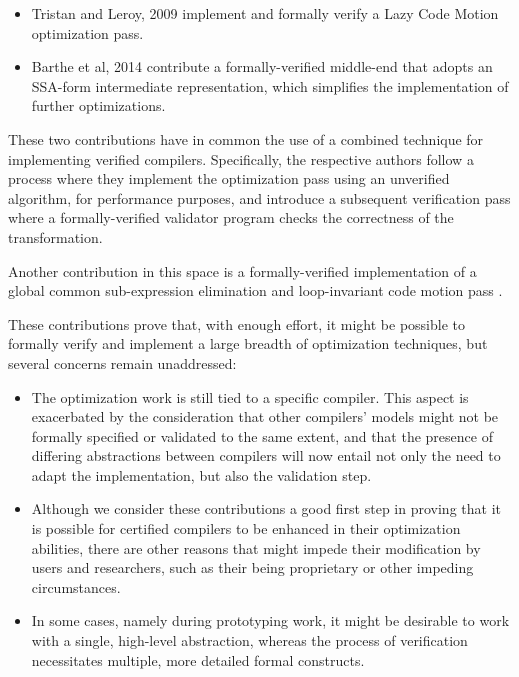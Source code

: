 \begin{itemize}
    \item Tristan and Leroy, 2009 \cite{Tristan2009} implement and formally verify a Lazy Code Motion optimization pass.
    \item Barthe et al, 2014 \cite{Barthe2014} contribute a formally-verified middle-end that adopts an SSA-form intermediate representation, which simplifies the implementation of further optimizations.
\end{itemize}

These two contributions have in common the use of a combined technique for implementing verified compilers. Specifically, the respective authors follow a process where they implement the optimization pass using an unverified algorithm, for performance purposes, and introduce a subsequent verification pass where a formally-verified validator program checks the correctness of the transformation.

Another contribution in this space is a formally-verified implementation of a global common sub-expression elimination and loop-invariant code motion pass \cite{Monniaux2021}.

These contributions prove that, with enough effort, it might be possible to formally verify and implement a large breadth of optimization techniques, but several concerns remain unaddressed:

\begin{itemize}
    \item The optimization work is still tied to a specific compiler. This aspect is exacerbated by the consideration that other compilers' models might not be formally specified or validated to the same extent, and that the presence of differing abstractions between compilers will now entail not only the need to adapt the implementation, but also the validation step.
    \item Although we consider these contributions a good first step in proving that it is possible for certified compilers to be enhanced in their optimization abilities, there are other reasons that might impede their modification by users and researchers, such as their being proprietary or other impeding circumstances.
    \item In some cases, namely during prototyping work, it might be desirable to work with a single, high-level abstraction, whereas the process of verification necessitates multiple, more detailed formal constructs.
\end{itemize}

